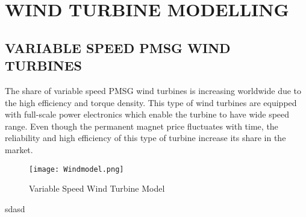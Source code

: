 \chapter{WIND TURBINE MODELLING}
\label{chp:3}

\section{VARIABLE SPEED PMSG WIND TURBINES}

The share of variable speed PMSG wind turbines is increasing worldwide due to the high efficiency and torque density. This type of wind turbines are equipped with full-scale power electronics which enable the turbine to have wide speed range. Even though the permanent magnet price fluctuates with time, the reliability and high efficiency of this type of turbine increase its share in the market. \\

 

\begin{figure}[h!]
	\centering
	\texttt{[image: Windmodel.png]}
	\caption{Variable Speed Wind Turbine Model}
	\label{varspeedpmsg}
\end{figure} 

sdasd